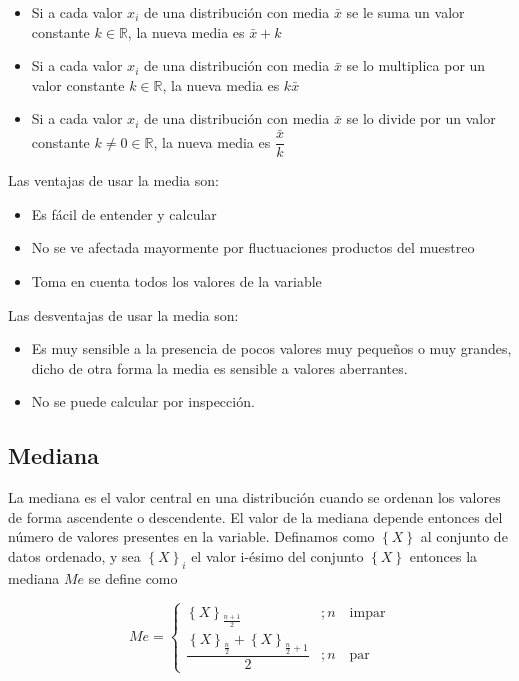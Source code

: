 \documentclass[]{book}
\providecommand{\tightlist}{%
  \setlength{\itemsep}{0pt}\setlength{\parskip}{0pt}}
\begin{document}
\begin{itemize}
\tightlist
\item
  Si a cada valor \(x_i\) de una distribución con media \(\bar{x}\) se le suma un valor constante \(k \in \mathbb{R}\), la nueva media es \(\bar{x}+k\)
\item
  Si a cada valor \(x_i\) de una distribución con media \(\bar{x}\) se lo multiplica por un valor constante \(k \in \mathbb{R}\), la nueva media es \(k\bar{x}\)
\item
  Si a cada valor \(x_i\) de una distribución con media \(\bar{x}\) se lo divide por un valor constante \(k \neq 0 \in \mathbb{R}\), la nueva media es \(\dfrac{\bar{x}}{k}\)
\end{itemize}

Las ventajas de usar la media son:

\begin{itemize}
\tightlist
\item
  Es fácil de entender y calcular
\item
  No se ve afectada mayormente por fluctuaciones productos del muestreo
\item
  Toma en cuenta todos los valores de la variable
\end{itemize}

Las desventajas de usar la media son:

\begin{itemize}
\tightlist
\item
  Es muy sensible a la presencia de pocos valores muy pequeños o muy grandes, dicho de otra forma la media es sensible a valores aberrantes.
\item
  No se puede calcular por inspección.
\end{itemize}

\hypertarget{mediana}{%
\subsection{Mediana}\label{mediana}}

La mediana es el valor central en una distribución cuando se ordenan los valores de forma ascendente o descendente. El valor de la mediana depende entonces del número de valores presentes en la variable. Definamos como \(\left\{ X \right \}\) al conjunto de datos ordenado, y sea \(\left \{ X \right \}_i\) el valor i-ésimo del conjunto \(\left \{ X \right \}\) entonces la mediana \(Me\) se define como

\begin{equation}
Me = \begin{cases} 
      \left \{ X \right\}_{\frac{n+1}{2}} & ; n \quad \textrm{impar}  \\
      \dfrac{\left \{ X  \right \}_{\frac{n}{2}} + \left \{ X  \right \}_{\frac{n}{2}+1} }{2} & ; n \quad \textrm{par}
   \end{cases}
   \label{eq:median}
\end{equation}
\end{document}
